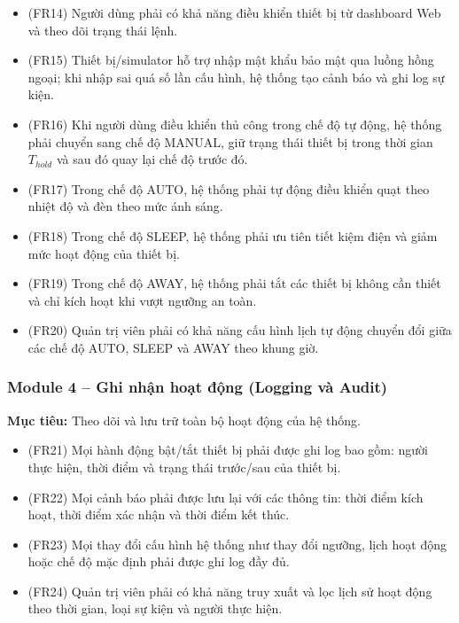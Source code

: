 \begin{itemize}
    \item (FR14) Người dùng phải có khả năng điều khiển thiết bị từ dashboard Web và theo dõi trạng thái lệnh.
    
    \item (FR15) Thiết bị/simulator hỗ trợ nhập mật khẩu bảo mật qua luồng hồng ngoại; khi nhập sai quá số lần cấu hình, hệ thống tạo cảnh báo và ghi log sự kiện.
    
    \item (FR16) Khi người dùng điều khiển thủ công trong chế độ tự động, hệ thống phải chuyển sang chế độ MANUAL, giữ trạng thái thiết bị trong thời gian $T_{hold}$ và sau đó quay lại chế độ trước đó.
    
    \item (FR17) Trong chế độ AUTO, hệ thống phải tự động điều khiển quạt theo nhiệt độ và đèn theo mức ánh sáng.
    
    \item (FR18) Trong chế độ SLEEP, hệ thống phải ưu tiên tiết kiệm điện và giảm mức hoạt động của thiết bị.
    
    \item (FR19) Trong chế độ AWAY, hệ thống phải tắt các thiết bị không cần thiết và chỉ kích hoạt khi vượt ngưỡng an toàn.
    
    \item (FR20) Quản trị viên phải có khả năng cấu hình lịch tự động chuyển đổi giữa các chế độ AUTO, SLEEP và AWAY theo khung giờ.
\end{itemize}

\subsubsection{Module 4 – Ghi nhận hoạt động (Logging và Audit)}

\textbf{Mục tiêu:} Theo dõi và lưu trữ toàn bộ hoạt động của hệ thống.

\begin{itemize}
    \item (FR21) Mọi hành động bật/tắt thiết bị phải được ghi log bao gồm: người thực hiện, thời điểm và trạng thái trước/sau của thiết bị.
    
    \item (FR22) Mọi cảnh báo phải được lưu lại với các thông tin: thời điểm kích hoạt, thời điểm xác nhận và thời điểm kết thúc.
    
    \item (FR23) Mọi thay đổi cấu hình hệ thống như thay đổi ngưỡng, lịch hoạt động hoặc chế độ mặc định phải được ghi log đầy đủ.
    
    \item (FR24) Quản trị viên phải có khả năng truy xuất và lọc lịch sử hoạt động theo thời gian, loại sự kiện và người thực hiện.
\end{itemize}

